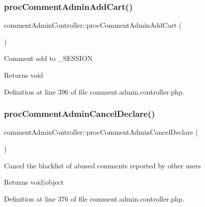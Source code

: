 \subsubsection{\texorpdfstring{proc\+Comment\+Admin\+Add\+Cart()}{procCommentAdminAddCart()}}
{\footnotesize\ttfamily comment\+Admin\+Controller\+::proc\+Comment\+Admin\+Add\+Cart (\begin{DoxyParamCaption}{ }\end{DoxyParamCaption})}

Comment add to \+\_\+\+S\+E\+S\+S\+I\+ON \begin{DoxyReturn}{Returns}
void 
\end{DoxyReturn}


Definition at line 396 of file comment.\+admin.\+controller.\+php.

\hypertarget{classcommentAdminController_ae0673fe66c74aa6ebfd8c6f1e5d0c627}{}\label{classcommentAdminController_ae0673fe66c74aa6ebfd8c6f1e5d0c627} 
\subsubsection{\texorpdfstring{proc\+Comment\+Admin\+Cancel\+Declare()}{procCommentAdminCancelDeclare()}}
{\footnotesize\ttfamily comment\+Admin\+Controller\+::proc\+Comment\+Admin\+Cancel\+Declare (\begin{DoxyParamCaption}{ }\end{DoxyParamCaption})}

Cancel the blacklist of abused comments reported by other users \begin{DoxyReturn}{Returns}
void$\vert$object 
\end{DoxyReturn}


Definition at line 376 of file comment.\+admin.\+controller.\+php.

\hypertarget{classcommentAdminController_a7d6c3e0db01617f4789f42617a876da0}{}\label{classcommentAdminController_a7d6c3e0db01617f4789f42617a876da0} 
